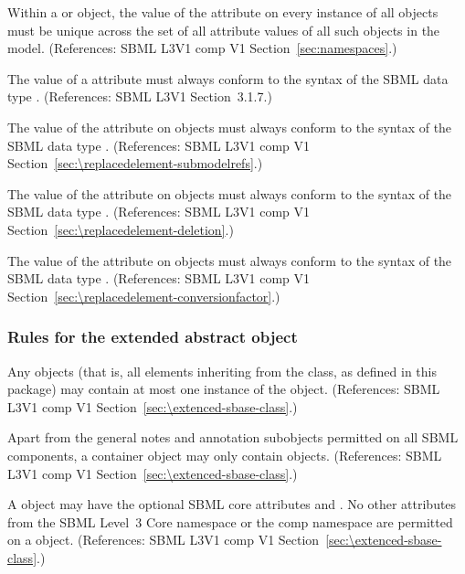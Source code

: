\begin{sbmlenum}
 {  Within a \Model or \ExternalModelDefinition
  object, the value of the attribute  on every instance
  of all \Port objects must be unique across the set of all
   attribute values of all such objects in the model.
  (References: SBML L3V1 comp V1 Section~\ref{sec:namespaces}.) }


 { The value of a  attribute must
  always conform to the syntax of the SBML data type .
  (References: SBML L3V1 Section~3.1.7.)}

  
 { The value of the  attribute on
  \ReplacedElement objects must always conform to the syntax of
  the SBML data type .
  (References: SBML L3V1 comp V1 Section~\ref{sec:\replacedelement-submodelrefs}.) }
 
  
 { The value of the  attribute on
  \ReplacedElement objects must always conform to the syntax of
  the SBML data type .
  (References: SBML L3V1 comp V1 Section~\ref{sec:\replacedelement-deletion}.) }

  
 { The value of the  attribute on
  \ReplacedElement objects must always conform to the syntax of
  the SBML data type .
  (References: SBML L3V1 comp V1 Section~\ref{sec:\replacedelement-conversionfactor}.) }
  

\end{sbmlenum} \subsubsection*{Rules for the extended  abstract object} \begin{sbmlenum}

 { Any \SBase objects (that is, all elements inheriting
  from the \SBase class, as defined in this package) may contain at most one 
  instance of the \ListOfReplacedElements object.
  (References: SBML L3V1 comp V1 Section~\ref{sec:\extenced-sbase-class}.) }


 { Apart from the general notes and annotation
  subobjects permitted on all SBML components, a \ListOfReplacedElements
  container object may only contain \ReplacedElement objects. 
  (References: SBML L3V1 comp V1 Section~\ref{sec:\extenced-sbase-class}.) }


 { A \ListOfReplacedElements object may have the optional 
  SBML core attributes  and .  No other attributes 
  from the SBML Level~3 Core namespace or the comp namespace are permitted on 
  a \ListOfReplacedElements object. 
  (References: SBML L3V1 comp V1 Section~\ref{sec:\extenced-sbase-class}.) }



\end{sbmlenum}
